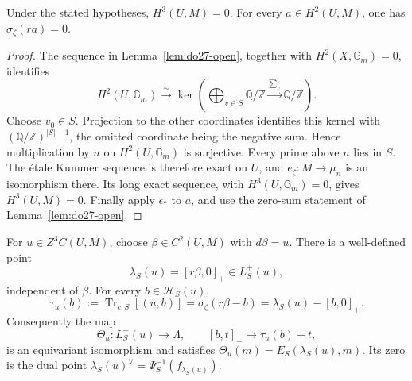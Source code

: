 \begin{lemma}
\label{lem:do28-global-primitive}
Under the stated hypotheses, \(H^3(U,M)=0\).
For every \(a\in H^2(U,M)\), one has
\(\sigma_\zeta(r a)=0\).
\end{lemma}

\begin{proof}
The sequence in Lemma~\ref{lem:do27-open}, together with
\(H^2(X,\mathbb G_m)=0\), identifies
\[
 H^2(U,\mathbb G_m)
 \xrightarrow{\sim}
 \ker\left(\bigoplus_{v\in S}\mathbb Q/\mathbb Z
                         \xrightarrow{\sum_v}\mathbb Q/\mathbb Z\right).
\]
Choose \(v_0\in S\). Projection to the other coordinates identifies
this kernel with \((\mathbb Q/\mathbb Z)^{|S|-1}\), the omitted
coordinate being the negative sum. Hence multiplication by \(n\)
on \(H^2(U,\mathbb G_m)\) is surjective.
Every prime above \(n\) lies in \(S\). The \'etale Kummer sequence
is therefore exact on \(U\), and \(e_\zeta:M\to\mu_n\) is an
isomorphism there. Its long exact sequence, with
\(H^3(U,\mathbb G_m)=0\), gives \(H^3(U,M)=0\).
Finally apply \(\epsilon_*\) to \(a\), and use the zero-sum
statement of Lemma~\ref{lem:do27-open}.
\end{proof}

\begin{theorem}
\label{thm:do28-state}
For \(u\in Z^3C(U,M)\), choose \(\beta\in C^2(U,M)\) with
\(d\beta=u\). There is a well-defined point
\begin{equation}
\label{eq:do28-state}
 \lambda_S(u)=[r\beta,0]_+\in L_S^+(u),
\end{equation}
independent of \(\beta\). For every \(b\in\mathcal H_S(u)\),
\begin{equation}
\label{eq:do28-state-trace}
 \tau_u(b):=\operatorname{Tr}_{c,S}[(u,b)]
   =\sigma_\zeta(r\beta-b)
   =\lambda_S(u)-[b,0]_+.
\end{equation}
Consequently the map
\[
 \Theta_u:L_S^-(u)\longrightarrow\Lambda,
 \qquad [b,t]_-\longmapsto\tau_u(b)+t,
\]
is an equivariant isomorphism and satisfies
\(\Theta_u(m)=E_S(\lambda_S(u),m)\).
Its zero is the dual point \(\lambda_S(u)^\vee=\Psi_S^{-1}(f_{\lambda_S(u)})\).
\end{theorem}

